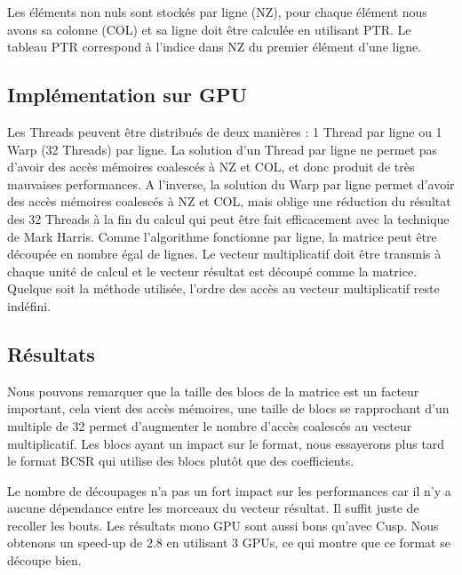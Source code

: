 \documentclass[a4paper,11pt]{report}
\begin{document}
   Les éléments non nuls sont stockés par ligne (NZ), pour chaque élément nous
   avons sa colonne (COL) et sa ligne doit être calculée en utilisant
   PTR. Le tableau PTR correspond à l'indice dans NZ du premier élément
   d'une ligne.
   
  \subsection{Implémentation sur GPU}
   Les Threads peuvent être distribués de deux manières : 1 Thread par
   ligne ou 1 Warp (32 Threads) par ligne. La solution d'un Thread par
   ligne ne permet pas d'avoir des accès mémoires coalescés à NZ et
   COL, et donc produit de très mauvaises performances. A l'inverse, la
   solution du Warp par ligne permet d'avoir des accès mémoires
   coalescés à NZ et COL, mais oblige une réduction du résultat des 32 Threads à la
   fin du calcul qui peut être fait efficacement avec la technique de
   Mark Harris\cite{HarrisReductionCUDA}. Comme l'algorithme
   fonctionne par ligne, la matrice peut être découpée en nombre égal
   de lignes. Le vecteur multiplicatif doit être transmis à chaque
   unité de calcul et le vecteur résultat est découpé comme la matrice.
   Quelque soit la méthode utilisée, l'ordre des accès au vecteur
   multiplicatif reste indéfini.
   

  \subsection{Résultats}
   
   Nous pouvons remarquer que la taille des blocs de la matrice est un
   facteur important, cela vient des accès mémoires, une taille de blocs
   se rapprochant d'un multiple de 32 permet d'augmenter le nombre
   d'accès coalescés au vecteur multiplicatif. Les blocs ayant un
   impact sur le format, nous essayerons plus tard le format BCSR qui
   utilise des blocs plutôt que des coefficients.

   Le nombre de découpages
   n'a pas un fort impact sur les performances car il n'y a aucune
   dépendance entre les morceaux du vecteur résultat. Il suffit juste de
   recoller les bouts. Les résultats mono GPU sont aussi bons qu'avec
   Cusp. Nous obtenons un speed-up de 2.8 en utilisant 3 GPUs, ce qui
   montre que ce format se découpe bien. 
\end{document}
